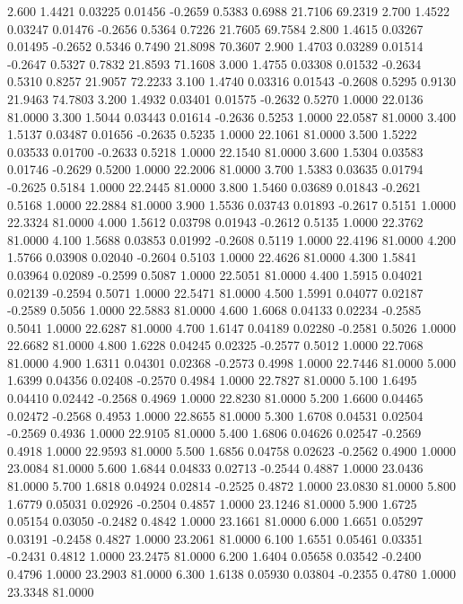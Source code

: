    2.600   1.4421   0.03225   0.01456  -0.2659   0.5383   0.6988  21.7106  69.2319
   2.700   1.4522   0.03247   0.01476  -0.2656   0.5364   0.7226  21.7605  69.7584
   2.800   1.4615   0.03267   0.01495  -0.2652   0.5346   0.7490  21.8098  70.3607
   2.900   1.4703   0.03289   0.01514  -0.2647   0.5327   0.7832  21.8593  71.1608
   3.000   1.4755   0.03308   0.01532  -0.2634   0.5310   0.8257  21.9057  72.2233
   3.100   1.4740   0.03316   0.01543  -0.2608   0.5295   0.9130  21.9463  74.7803
   3.200   1.4932   0.03401   0.01575  -0.2632   0.5270   1.0000  22.0136  81.0000
   3.300   1.5044   0.03443   0.01614  -0.2636   0.5253   1.0000  22.0587  81.0000
   3.400   1.5137   0.03487   0.01656  -0.2635   0.5235   1.0000  22.1061  81.0000
   3.500   1.5222   0.03533   0.01700  -0.2633   0.5218   1.0000  22.1540  81.0000
   3.600   1.5304   0.03583   0.01746  -0.2629   0.5200   1.0000  22.2006  81.0000
   3.700   1.5383   0.03635   0.01794  -0.2625   0.5184   1.0000  22.2445  81.0000
   3.800   1.5460   0.03689   0.01843  -0.2621   0.5168   1.0000  22.2884  81.0000
   3.900   1.5536   0.03743   0.01893  -0.2617   0.5151   1.0000  22.3324  81.0000
   4.000   1.5612   0.03798   0.01943  -0.2612   0.5135   1.0000  22.3762  81.0000
   4.100   1.5688   0.03853   0.01992  -0.2608   0.5119   1.0000  22.4196  81.0000
   4.200   1.5766   0.03908   0.02040  -0.2604   0.5103   1.0000  22.4626  81.0000
   4.300   1.5841   0.03964   0.02089  -0.2599   0.5087   1.0000  22.5051  81.0000
   4.400   1.5915   0.04021   0.02139  -0.2594   0.5071   1.0000  22.5471  81.0000
   4.500   1.5991   0.04077   0.02187  -0.2589   0.5056   1.0000  22.5883  81.0000
   4.600   1.6068   0.04133   0.02234  -0.2585   0.5041   1.0000  22.6287  81.0000
   4.700   1.6147   0.04189   0.02280  -0.2581   0.5026   1.0000  22.6682  81.0000
   4.800   1.6228   0.04245   0.02325  -0.2577   0.5012   1.0000  22.7068  81.0000
   4.900   1.6311   0.04301   0.02368  -0.2573   0.4998   1.0000  22.7446  81.0000
   5.000   1.6399   0.04356   0.02408  -0.2570   0.4984   1.0000  22.7827  81.0000
   5.100   1.6495   0.04410   0.02442  -0.2568   0.4969   1.0000  22.8230  81.0000
   5.200   1.6600   0.04465   0.02472  -0.2568   0.4953   1.0000  22.8655  81.0000
   5.300   1.6708   0.04531   0.02504  -0.2569   0.4936   1.0000  22.9105  81.0000
   5.400   1.6806   0.04626   0.02547  -0.2569   0.4918   1.0000  22.9593  81.0000
   5.500   1.6856   0.04758   0.02623  -0.2562   0.4900   1.0000  23.0084  81.0000
   5.600   1.6844   0.04833   0.02713  -0.2544   0.4887   1.0000  23.0436  81.0000
   5.700   1.6818   0.04924   0.02814  -0.2525   0.4872   1.0000  23.0830  81.0000
   5.800   1.6779   0.05031   0.02926  -0.2504   0.4857   1.0000  23.1246  81.0000
   5.900   1.6725   0.05154   0.03050  -0.2482   0.4842   1.0000  23.1661  81.0000
   6.000   1.6651   0.05297   0.03191  -0.2458   0.4827   1.0000  23.2061  81.0000
   6.100   1.6551   0.05461   0.03351  -0.2431   0.4812   1.0000  23.2475  81.0000
   6.200   1.6404   0.05658   0.03542  -0.2400   0.4796   1.0000  23.2903  81.0000
   6.300   1.6138   0.05930   0.03804  -0.2355   0.4780   1.0000  23.3348  81.0000
